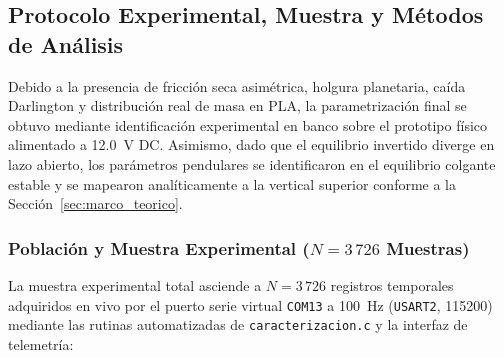 \subsection{Protocolo Experimental, Muestra y Métodos de Análisis}\label{subsec:identificacion}

Debido a la presencia de fricción seca asimétrica, holgura planetaria, caída Darlington y distribución real de masa en PLA, la parametrización final se obtuvo mediante identificación experimental en banco sobre el prototipo físico alimentado a \qty{12.0}{\volt} DC. Asimismo, dado que el equilibrio invertido diverge en lazo abierto, los parámetros pendulares se identificaron en el equilibrio colgante estable y se mapearon analíticamente a la vertical superior conforme a la Sección~\ref{sec:marco_teorico}.

\subsubsection{Población y Muestra Experimental (\texorpdfstring{$N = 3\,726$}{N = 3726} Muestras)}
La muestra experimental total asciende a $N = 3\,726$ registros temporales adquiridos en vivo por el puerto serie virtual \texttt{COM13} a \qty{100}{\hertz} (\texttt{USART2}, \qty{115200}{\baud}) mediante las rutinas automatizadas de \texttt{caracterizacion.c} y la interfaz de telemetría:
